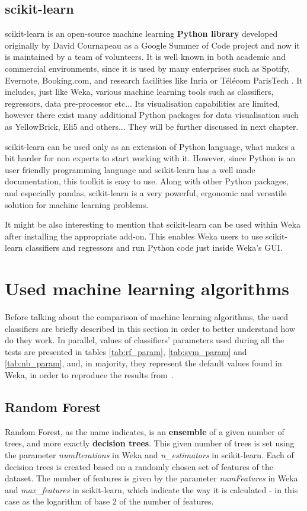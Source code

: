 \subsection{scikit-learn}
scikit-learn is an open-source machine learning \textbf{Python library} developed originally by David Cournapeau as a Google Summer of Code project and now it is maintained by a team of volunteers. It is well known in both academic and commercial environments, since it is used by many enterprises such as Spotify, Evernote, Booking.com, and research facilities like Inria or Télécom ParisTech \cite{noauthor_who_nodate}. It includes, just like Weka, various machine learning tools such as classifiers, regressors, data pre-processor etc... Its visualisation capabilities are limited, however there exist many additional Python packages for data visualisation such as YellowBrick, Eli5 and others... They will be further discussed in next chapter.

scikit-learn can be used only as an extension of Python language, what makes a bit harder for non experts to start working with it. However, since Python is an user friendly programming language and scikit-learn has a well made documentation, this toolkit is easy to use. Along with other Python packages, and especially pandas, scikit-learn is a very powerful, ergonomic and versatile solution for machine learning problems.  

It might be also interesting to mention that scikit-learn can be used within Weka after installing the appropriate add-on. This enables Weka users to use scikit-learn classifiers and regressors and run Python code just inside Weka's GUI.

\section{Used machine learning algorithms}
Before talking about the comparison of machine learning algorithms, the used classifiers are briefly described in this section in order to better understand how do they work. In parallel, values of classifiers' parameters used during all the tests are presented in tables \ref{tab:rf_param}, \ref{tab:svm_param} and \ref{tab:nb_param}, and, in majority, they represent the default values found in Weka, in order to reproduce the results from~\cite{borges_hink_machine_2014-1}.

\subsection{Random Forest} \label{sec:rf}
Random Forest, as the name indicates, is an \textbf{ensemble} of a given number of trees, and more exactly \textbf{decision trees}. This given number of trees is set using the parameter \textit{numIterations} in Weka and \textit{n\_estimators} in scikit-learn. Each of decision trees is created based on a randomly chosen set of features of the dataset. The number of features is given by the parameter \textit{numFeatures} in Weka and \textit{max\_features} in scikit-learn, which indicate the way it is calculated - in this case as the logarithm of base 2 of the number of features. 

